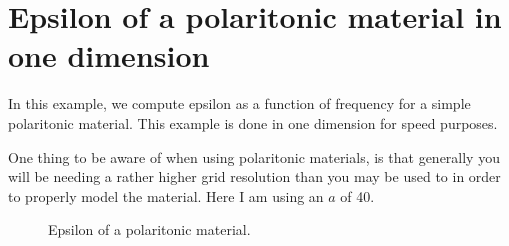 \begin{comment}
#include <stdio.h>
#include <stdlib.h>
#include <signal.h>

#include "dactyl.h"
\end{comment}

\section{Epsilon of a polaritonic material in one dimension}

In this example, we compute epsilon as a function of frequency for a simple
polaritonic material.  This example is done in one dimension for speed
purposes.

One thing to be aware of when using polaritonic materials, is that
generally you will be needing a rather higher grid resolution than you may
be used to in order to properly model the material.  Here I am using an $a$
of 40.

\begin{figure}
\label{epsilon_polariton}
\caption{Epsilon of a polaritonic material.}
\end{figure}


